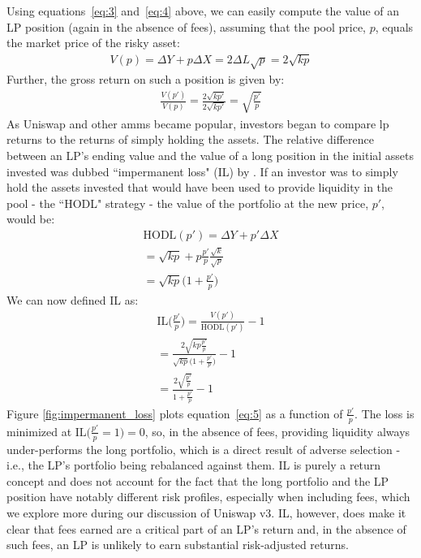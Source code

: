 \documentclass[11pt]{article}
\begin{document}
Using equations~\eqref{eq:3} and~\eqref{eq:4} above, we can easily compute the value of an LP position (again in the absence of fees), assuming that the pool price, $p$, equals the market price of the risky asset:
\begin{gather*}
    V(p) = \Delta Y + p \Delta X = 2 \Delta L \sqrt{p} = 2 \sqrt{k p}
\end{gather*}
Further, the gross return on such a position is given by:
\begin{gather*}
    \frac{V(p')}{V(p)} = \frac{2 \sqrt{k p'}}{2 \sqrt{k p'}} = \sqrt{\frac{p'}{p}}
\end{gather*}
As Uniswap and other \glspl{amm} became popular, investors began to compare \gls{lp} returns to the returns of simply holding the assets. The relative difference between an LP's ending value and the value of a long position in the initial assets invested was dubbed ``impermanent loss" (IL) by \citet{PintailMedium}. If an investor was to simply hold the assets invested that would have been used to provide liquidity in the pool - the ``HODL" strategy - the value of the portfolio at the new price, $p'$, would be:
\begin{gather*}
    \text{HODL}(p') = \Delta Y + p' \Delta X \\
    = \sqrt{kp} + p\frac{p'}{p} \frac{\sqrt{k}}{\sqrt{p}} \\
    = \sqrt{kp} \bigg( 1 + \frac{p'}{p} \bigg)
\end{gather*}
We can now defined IL as:
\begin{gather}
    \text{IL}\bigg( \frac{p'}{p} \bigg) = \frac{V(p')}{\text{HODL}(p')} - 1 \nonumber \\
    = \frac{2 \sqrt{k p \frac{p'}{p}}}{\sqrt{kp} \bigg( 1 + \frac{p'}{p} \bigg)} - 1 \nonumber \\
    = \frac{2 \sqrt{\frac{p'}{p}}}{1 + \frac{p'}{p}} - 1 \label{eq:5}
\end{gather}
Figure \ref{fig:impermanent_loss} plots equation~\eqref{eq:5} as a function of $\frac{p'}{p}$. The loss is minimized at $\text{IL}\bigl( \frac{p'}{p} = 1 \bigl) = 0$, so, in the absence of fees, providing liquidity always under-performs the long portfolio, which is a direct result of adverse selection - i.e., the LP's portfolio being rebalanced against them. IL is purely a return concept and does not account for the fact that the long portfolio and the LP position have notably different risk profiles, especially when including fees, which we explore more during our discussion of Uniswap v3. IL, however, does make it clear that fees earned are a critical part of an LP's return and, in the absence of such fees, an LP is unlikely to earn substantial risk-adjusted returns.
\end{document}
